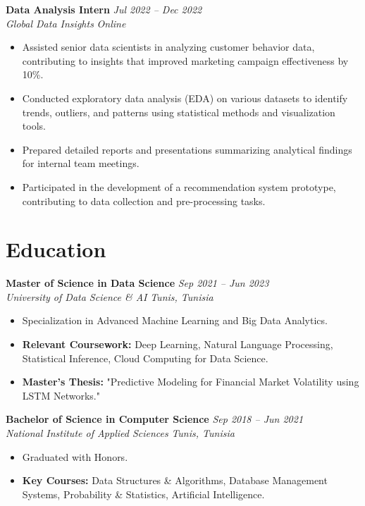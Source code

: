 \documentclass[10pt, letterpaper]{article} %
\begin{document}
\textbf{Data Analysis Intern} \hfill \textit{Jul 2022 -- Dec 2022} \\
\textit{Global Data Insights} \hfill \textit{Online}
\begin{itemize}
    \item Assisted senior data scientists in analyzing customer behavior data, contributing to insights that improved marketing campaign effectiveness by 10\%.
    \item Conducted exploratory data analysis (EDA) on various datasets to identify trends, outliers, and patterns using statistical methods and visualization tools.
    \item Prepared detailed reports and presentations summarizing analytical findings for internal team meetings.
    \item Participated in the development of a recommendation system prototype, contributing to data collection and pre-processing tasks.
\end{itemize}

\section*{Education}

\textbf{Master of Science in Data Science} \hfill \textit{Sep 2021 -- Jun 2023} \\
\textit{University of Data Science \& AI} \hfill \textit{Tunis, Tunisia}
\begin{itemize}
    \item Specialization in Advanced Machine Learning and Big Data Analytics.
    \item \textbf{Relevant Coursework:} Deep Learning, Natural Language Processing, Statistical Inference, Cloud Computing for Data Science.
    \item \textbf{Master's Thesis:} "Predictive Modeling for Financial Market Volatility using LSTM Networks."
\end{itemize}

\textbf{Bachelor of Science in Computer Science} \hfill \textit{Sep 2018 -- Jun 2021} \\
\textit{National Institute of Applied Sciences} \hfill \textit{Tunis, Tunisia}
\begin{itemize}
    \item Graduated with Honors.
    \item \textbf{Key Courses:} Data Structures \& Algorithms, Database Management Systems, Probability \& Statistics, Artificial Intelligence.
\end{itemize}
\end{document}
